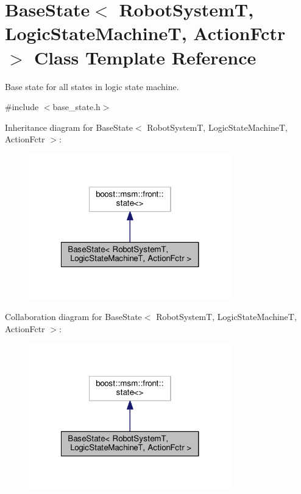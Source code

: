 \hypertarget{classBaseState}{\section{Base\-State$<$ Robot\-System\-T, Logic\-State\-Machine\-T, Action\-Fctr $>$ Class Template Reference}
\label{classBaseState}
}


Base state for all states in logic state machine.  




{\ttfamily \#include $<$base\-\_\-state.\-h$>$}



Inheritance diagram for Base\-State$<$ Robot\-System\-T, Logic\-State\-Machine\-T, Action\-Fctr $>$\-:\nopagebreak
\begin{figure}[H]
\begin{center}
\leavevmode
\includegraphics[width=248pt]{classBaseState__inherit__graph}
\end{center}
\end{figure}


Collaboration diagram for Base\-State$<$ Robot\-System\-T, Logic\-State\-Machine\-T, Action\-Fctr $>$\-:\nopagebreak
\begin{figure}[H]
\begin{center}
\leavevmode
\includegraphics[width=248pt]{classBaseState__coll__graph}
\end{center}
\end{figure}
